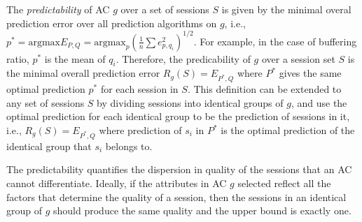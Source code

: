 The {\it predictability} of AC $g$ over a set of sessions $S$ is given by the minimal overal prediction error over all prediction algorithms on $g$, i.e., $p^*=\textrm{argmax}E_{P,Q}=\textrm{argmax}_p\left(\frac{1}{n}\sum e_{p,q_i}^2\right)^{1/2}$. For example, in the case of buffering ratio, $p^*$ is the mean of $q_i$. Therefore, the predicability of $g$ over a session set $S$ is the minimal overall prediction error $R_g(S)=E_{P^*,Q}$ where $P^*$ gives the same optimal prediction $p^*$ for each session in $S$. This definition can be extended to any set of sessions $S$ by dividing sessions into identical groups of $g$, and use the optimal prediction for each identical group to be the prediction of sessions in it, i.e., $R_g(S)=E_{P^*,Q}$ where prediction of $s_i$ in $P^*$ is the optimal prediction of the identical group that $s_i$ belongs to.


The predictability quantifies the dispersion in quality of the sessions that an AC cannot differentiate. Ideally, if the attributes in AC $g$ selected reflect all the factors that determine the quality of a session, then the sessions in an identical group of $g$ should produce the same quality and the upper bound is exactly one. 



